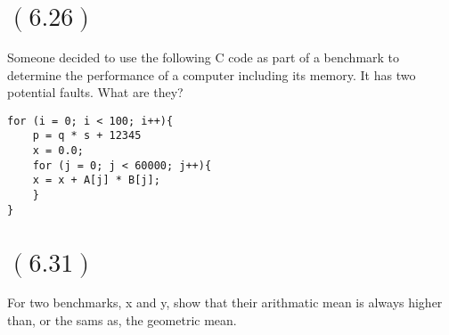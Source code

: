 \documentclass[letterpaper,12pt,titlepage]{article}
\begin{document}
\begin{mdframed}[style=MyFrame]
\end{mdframed}

\section*{$(6.26)$} Someone decided to use the following C code as part of a benchmark to determine the performance of a computer including its memory. It has two potential faults. What are they?

\begin{verbatim}
for (i = 0; i < 100; i++){
    p = q * s + 12345
    x = 0.0;
    for (j = 0; j < 60000; j++){
    x = x + A[j] * B[j];
    }
}
\end{verbatim}

\begin{mdframed}[style=MyFrame]
\end{mdframed}

\section*{$(6.31)$} For two benchmarks, x and y, show that their arithmatic mean is always higher than, or the sams as, the geometric mean.

\begin{mdframed}[style=MyFrame]
\end{mdframed}



\end{document}
